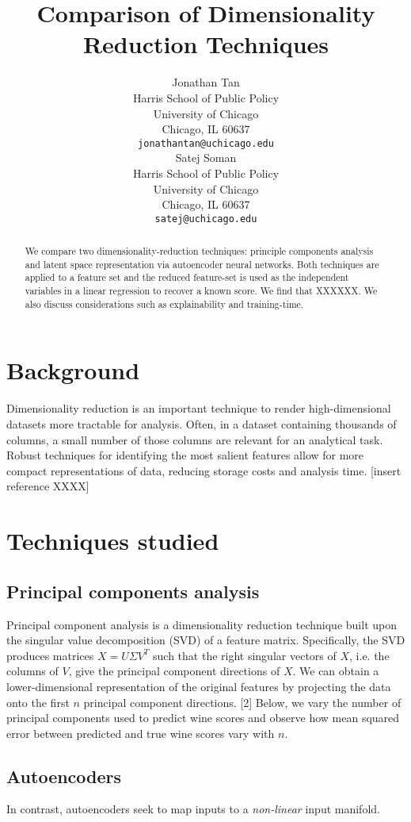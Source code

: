 \documentclass{article}
\title{Comparison of Dimensionality Reduction Techniques}
\author{%
  Jonathan Tan \\
  Harris School of Public Policy\\
  University of Chicago\\
  Chicago, IL 60637 \\
  \texttt{jonathantan@uchicago.edu} \\
  \And
  Satej Soman \\
  Harris School of Public Policy\\
  University of Chicago\\
  Chicago, IL 60637 \\
  \texttt{satej@uchicago.edu} \\
}
\begin{document}
\maketitle

\begin{abstract}
  We compare two dimensionality-reduction techniques: principle components analysis and latent space representation via autoencoder neural networks. Both techniques are applied to a feature set and the reduced feature-set is used as the independent variables in a linear regression to recover a known score. We find that XXXXXX. We also discuss considerations such as explainability and training-time.
\end{abstract}

\section{Background}
Dimensionality reduction is an important technique to render high-dimensional datasets more tractable for analysis. Often, in a dataset containing thousands of columns, a small number of those columns are relevant for an analytical task. Robust techniques for identifying the most salient features allow for more compact representations of data, reducing storage costs and analysis time. [insert reference XXXX]

\section{Techniques studied}
\subsection{Principal components analysis}
Principal component analysis is a dimensionality reduction technique built upon the singular value decomposition (SVD) of a feature matrix. Specifically, the SVD produces matrices $X = U \Sigma V^T$ such that the right singular vectors of $X$, i.e. the columns of $V$, give the principal component directions of $X$. We can obtain a lower-dimensional representation of the original features by projecting the data onto the first $n$ principal component directions. [2] Below, we vary the number of principal components used to predict wine scores and observe how mean squared error between predicted and true wine scores vary with $n$.
\subsection{Autoencoders}
In contrast, autoencoders seek to map inputs to a \emph{non-linear} input manifold. 
\end{document}

